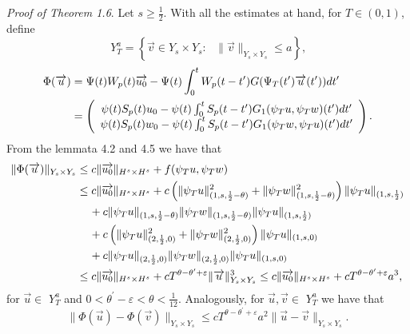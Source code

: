 \documentclass[reqno]{amsart}
\numberwithin{equation}{section}
\begin{document}
\textit{Proof of Theorem 1.6}.
Let $s\geq\frac{1}{2}$. With all the estimates at hand, for $T\in\left(0,1\right) $,
define\[
Y_{T}^{a}=\left\{  \overrightarrow{v}\in Y_{s}\times
Y_{s}:\text{ \ }\| \overrightarrow{v}\|
_{Y_{s}\times Y_{s}}\leq
a\right\}  \text{,}\]\begin{align}\label{4.46}
\Phi(\overrightarrow{u})  &  =\Psi(t)W_{p}(t)\overrightarrow{{u}_{0}}
-\Psi(t)\int\nolimits_{0}^{t}W_{p}(t-t^{\prime})G(\Psi_{T}(t^{\prime
})\overrightarrow{u}(t^{\prime}))dt^{\prime}\\
&  =\left(
\begin{array}
[c]{c}\psi(t)S_{p}(t)u_{0}-\psi(t)\int\nolimits_{0}^{t}S_{p}(t-t^{\prime})G_{1}(\psi
_{T}u,\psi_{T}w)(t^{\prime})dt^{\prime}\\
\psi(t)S_p(t)w_{0}-\psi(t)\int\nolimits_{0}^{t}S_p(t-t^{\prime})G_{1}(\psi
_{T}w,\psi_{T}u)(t^{\prime})dt^{\prime}\end{array}
\right)\text{.} \nonumber
\end{align}
From the lemmata 4.2 and 4.5 we have that
\begin{align*}
\| \Phi(\overrightarrow{u})\| _{Y_{s}\times
Y_{s}} &  \leq c\| \overrightarrow{{u}_{0}}\|
_{H^{s}\times H^{s}}+f(\psi
_{T}u,\psi_{T}w)\\
&  \leq c\| \overrightarrow{{u}_{0}}\| _{H^{s}\times H^{s}}+c\left(  \| \psi_{T}u\| _{(1,s,\frac12-\theta)}^{2}+\| \psi_{T}w\| _{(1,s,\frac12
-\theta)}^{2}\right)  \| \psi_{T}u\| _{(1,s,\frac12)}\\
&\hspace{0.4cm}  +c\| \psi_{T}u\| _{(1,s,\frac12-\theta)}\| \psi_{T}w\| _{(1,s,\frac12
-\theta)}\| \psi_{T}u\| _{(1,s,\frac12)}\\
& \hspace{0.4cm} +c\left(  \| \psi_{T}u\| _{(2,\frac12,0)}^{2}+\| \psi_{T}w\| _{(2,\frac12
,0)}^{2}\right)  \| \psi_{T}u\| _{(1,s,0)}\\
& \hspace{0.4cm} +c\| \psi_{T}u\| _{(2,\frac12,0)}\| \psi_{T}w\| _{(2,\frac12
,0)}\| \psi_{T}u\| _{(1,s,0)}\\
&  \leq c\| \overrightarrow{{u}_{0}}\| _{H^{s}\times H^{s}
}+cT^{\theta-\theta^{\prime}+\varepsilon}\|
\overrightarrow{u}\| _{Y_{s}\times Y_{s}}^{3}\leq
c\| \overrightarrow{{u}_{0}}\|
_{H^{s}\times H^{s}}+cT^{\theta-\theta^{\prime}+\varepsilon}a^{3}\text{,}\end{align*}
for $\overrightarrow{u}\in$ $Y_{T}^{a}$ and $0<\theta^{'}
-\varepsilon<\theta<\frac{1}{12}$. Analogously, for
$\overrightarrow
{u},\overrightarrow{v}\in$ $Y_{T}^{a}$ we have that\begin{equation}\label{4.47}
\|
\Phi(\overrightarrow{u})-\Phi(\overrightarrow{v})\|
_{Y_{s}\times Y_{s}}\leq
cT^{\theta-\theta^{'}+\varepsilon}a^{2}\|
\overrightarrow{u}-\overrightarrow{v}\| _{Y_{s}\times
Y_{s}}\text{.}
\end{equation}
\end{document}
